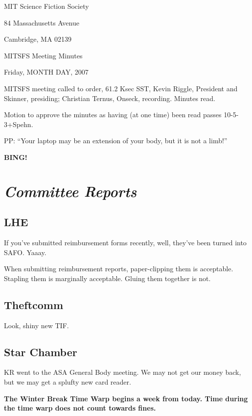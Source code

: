 \documentclass[10pt]{article}
\newcommand{\bing}{{\bf BING!} }
\newcommand{\goto}[1]{\bing \vskip 12pt \section*{{\em{#1}}}}
\begin{document}
\begin{center}

MIT Science Fiction Society

84 Massachusetts Avenue

Cambridge, MA 02139

\vspace{12pt}

MITSFS Meeting Minutes

Friday, MONTH DAY, 2007

\end{center}

\vspace{18pt}

\setlength{\parskip}{6pt}

\noindent
MITSFS meeting called to order, 61.2 Ksec SST,
Kevin Riggle, President and Skinner, presiding; Christian Ternus, Onseck, recording.
Minutes read.

Motion to approve the minutes as having (at one time) been read passes 10-5-3+Spehn.

PP:  ``Your laptop may be an extension of your body, but it is not a limb!''

\BING

\goto{Committee Reports}

\subsection*{LHE}

If you've submitted reimbursement forms recently, well, they've been turned into SAFO.  Yaaay.

When submitting reimbursement reports, paper-clipping them is acceptable.  Stapling them is marginally acceptable.  Gluing them together is not.

\subsection*{Theftcomm}

Look, shiny new TIF.

\subsection*{Star Chamber}

KR went to the ASA General Body meeting.  We may not get our money back, but we may get a splufty new card reader.

\textbf{The Winter Break Time Warp begins a week from today.  Time during the time warp does not count towards fines.}  
\end{document}
